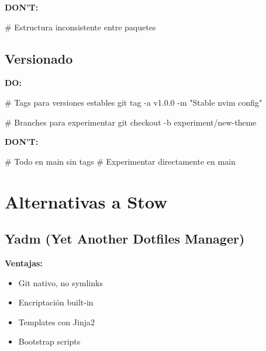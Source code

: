 \documentclass[
  doc,
  floatsintext,
  longtable,
  a4paper,
  nolmodern,
  notxfonts,
  notimes,
  12pt,
  colorlinks=true,linkcolor=blue,citecolor=blue,urlcolor=blue]{apa7}
\newenvironment{Shaded}{\begin{snugshade}}{\end{snugshade}}
\newcommand{\AttributeTok}[1]{\textcolor[rgb]{0.40,0.45,0.13}{#1}}
\newcommand{\CommentTok}[1]{\textcolor[rgb]{0.37,0.37,0.37}{#1}}
\newcommand{\FunctionTok}[1]{\textcolor[rgb]{0.28,0.35,0.67}{#1}}
\newcommand{\NormalTok}[1]{\textcolor[rgb]{0.00,0.23,0.31}{#1}}
\newcommand{\StringTok}[1]{\textcolor[rgb]{0.13,0.47,0.30}{#1}}
\providecommand{\tightlist}{%
  \setlength{\itemsep}{0pt}\setlength{\parskip}{0pt}}
\begin{document}
\textbf{DON'T:}

\begin{Shaded}
\begin{Highlighting}[]
\CommentTok{\# Estructura inconsistente entre paquetes}
\end{Highlighting}
\end{Shaded}

\subsection{Versionado}\label{versionado}

\textbf{DO:}

\begin{Shaded}
\begin{Highlighting}[]
\CommentTok{\# Tags para versiones estables}
\FunctionTok{git}\NormalTok{ tag }\AttributeTok{{-}a}\NormalTok{ v1.0.0 }\AttributeTok{{-}m} \StringTok{"Stable nvim config"}

\CommentTok{\# Branches para experimentar}
\FunctionTok{git}\NormalTok{ checkout }\AttributeTok{{-}b}\NormalTok{ experiment/new{-}theme}
\end{Highlighting}
\end{Shaded}

\textbf{DON'T:}

\begin{Shaded}
\begin{Highlighting}[]
\CommentTok{\# Todo en main sin tags}
\CommentTok{\# Experimentar directamente en main}
\end{Highlighting}
\end{Shaded}

\section{Alternativas a Stow}\label{alternativas-a-stow}

\subsection{Yadm (Yet Another Dotfiles
Manager)}\label{yadm-yet-another-dotfiles-manager}

\textbf{Ventajas:}

\begin{itemize}
\tightlist
\item
  Git nativo, no symlinks
\item
  Encriptación built-in
\item
  Templates con Jinja2
\item
  Bootstrap scripts
\end{itemize}
\end{document}
